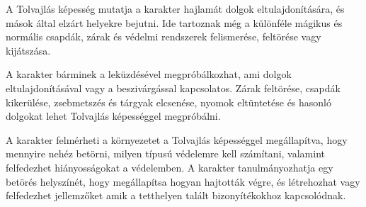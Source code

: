 
A Tolvajlás képesség mutatja a karakter hajlamát dolgok eltulajdonítására, és mások által elzárt helyekre bejutni. Ide tartoznak még a különféle mágikus és normális csapdák, zárak és védelmi rendszerek felismerése, feltörése vagy kijátszása.

\overcome A karakter bárminek a leküzdésével megpróbálkozhat, ami dolgok eltulajdonításával vagy a beszivárgással kapcsolatos. Zárak feltörése, csapdák kikerülése, zsebmetszés és tárgyak elcsenése, nyomok eltüntetése és hasonló dolgokat lehet Tolvajlás képességgel megpróbálni.

\advantage A karakter felmérheti a környezetet a Tolvajlás képességgel megállapítva, hogy mennyire nehéz betörni, milyen típusú védelemre kell számítani, valamint felfedezhet hiányosságokat a védelemben. A karakter tanulmányozhatja egy betörés helyszínét, hogy megállapítsa hogyan hajtották végre, és létrehozhat vagy felfedezhet jellemzőket amik a tetthelyen talált bizonyítékokhoz kapcsolódnak.

\noattackatall
 
\nodefendatall




